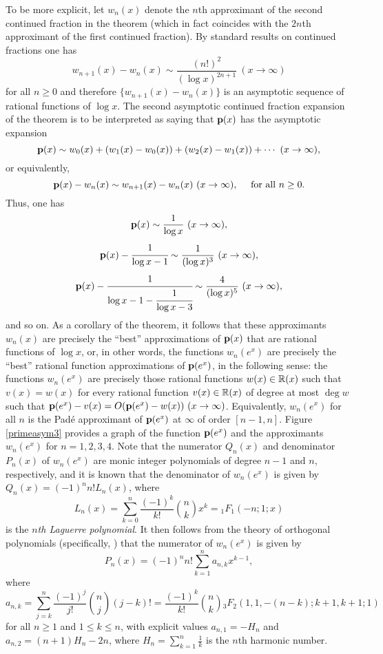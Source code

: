 \documentclass[12pt]{article}
\begin{document}
To be more explicit, let $w_n(x)$ denote the $n$th approximant of the second continued fraction in the theorem (which in fact coincides with the $2n$th approximant of the first continued fraction).  By standard results on continued fractions one has
$$w_{n+1}(x) - w_n(x) \sim \frac{(n!)^2}{(\log x)^{2n+1}} \ (x \to \infty)$$
for all $n \geq 0$ and therefore $\{w_{n+1}(x) - w_n(x)\}$ is an asymptotic sequence of rational functions of $\log x$.    The second asymptotic continued fraction expansion of the theorem is to be interpreted as saying that ${\mathbf p}(x)$ has the asymptotic expansion
$${\mathbf p}(x) \sim w_0(x) + (w_1(x)-w_0(x)) + (w_2(x)-w_1(x)) + \cdots \ (x \to \infty),$$
or equivalently,
$${\mathbf p}(x) - w_n(x) \sim w_{n+1}(x) - w_n(x) \ (x \to \infty), \quad \text{ for all } n \geq 0.$$
Thus, one has
$${\mathbf p}(x) \sim \frac{1}{\log x} \ (x \to \infty),$$
$${\mathbf p}(x) - \cfrac{1}{\log x - 1} \sim \frac{1}{(\log x)^3} \ (x \to \infty),$$
$${\mathbf p}(x) - \cfrac{1}{\log x - 1-\cfrac{1}{\log x -3}} \sim  \frac{4}{(\log x)^5} \ (x \to \infty),$$
and so on. As a corollary of the theorem, it follows that these approximants $w_n(x)$ are precisely the ``best''  approximations of ${\mathbf p}(x)$ that are rational functions of $\log x$, or, in other words, the functions $w_n(e^x)$ are precisely the ``best'' rational function approximations of ${\mathbf p}(e^x)$, in the following sense: the functions $w_n(e^x)$ are precisely those rational functions $w(x) \in {\mathbb R}(x)$ such that $v(x) = w(x)$ for every rational function $v(x) \in {\mathbb R}(x)$ of degree at most $\deg w$ such that ${\mathbf p}(e^x) - v(x) = O({\mathbf p}(e^x)-w(x)) \ (x \to \infty)$.   Equivalently, $w_n(e^x)$ for all $n$ is the Pad\'e approximant of ${\mathbf p}(e^x)$ at $\infty$ of order $[n-1,n]$.   Figure \ref{primeasym3} provides a graph of the function ${\mathbf p}(e^x)$ and the approximants $w_n(e^x)$ for $n = 1,2,3,4$.  Note that the numerator $Q_n(x)$ and denominator  $P_n(x)$ of $w_n(e^x)$ are monic integer polynomials of degree $n-1$ and $n$, respectively, and it is known that the denominator of $w_n(e^x)$ is given by $Q_n(x) = (-1)^n n! L_n(x)$, where
$$L_n(x) = \sum_{k = 0}^n \frac{(-1)^k}{k!}{n\choose k} x^k = {}_{1}F_{1}(-n;1;x)$$
is the  {\it $n$th Laguerre polynomial}.  It then follows from the theory of orthogonal polynomials (specifically, \cite[{[1.14]}]{akh}) that the numerator of $w_n(e^x)$ is given by
$$P_n(x) = (-1)^n n! \sum_{k = 1}^{n} a_{n,k} x^{k-1},$$
where $$a_{n,k} = \sum_{j = k}^n  \frac{(-1)^j}{j!} {n \choose j}(j-k)! =  \frac{(-1)^{k} }{k!} {n \choose k} {}_{3}F_{2}(1,1,-(n-k); k+1, k+1; 1)$$
for all $n \geq 1$ and $1 \leq k \leq n$,
with explicit values $a_{n,1} = -H_n$ and $a_{n,2} = (n+1)H_n-2n$, where $H_n = \sum_{k = 1}^n \frac{1}{k}$ is the $n$th harmonic number.
\end{document}
